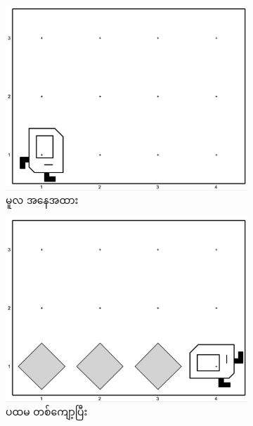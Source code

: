 \begin{figure}[tbh!]
    \newcommand{\figpctw}{0.3}
    \newcommand{\figscale}{0.1}
    \begin{subfigure}[t]{{\figpctw}\textwidth}
        \includegraphics[scale=\figscale]{images/ch02/beeper_fence/init.jpg}
        \caption{မူလ အနေအထား}    
    \end{subfigure}
    \begin{subfigure}[t]{{\figpctw}\textwidth}
        \includegraphics[scale=\figscale]{images/ch02/beeper_fence/1st_iter.jpg}
        \caption{ပထမ တစ်ကျော့ပြီး}    
    \end{subfigure}
    \begin{subfigure}[t]{{\figpctw}\textwidth}

\end{subfigure}
\end{figure}
